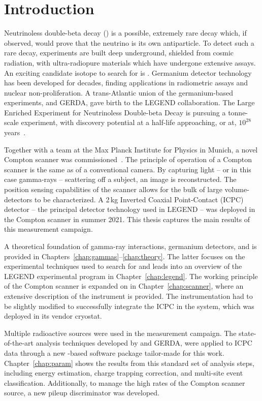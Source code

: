 \chapter{Introduction}

Neutrinoless double-beta decay (\novbb{}) is a possible, extremely rare decay which, if observed, would prove that the neutrino is its own antiparticle. To detect such a rare decay, \novbb{} experiments are built deep underground, shielded from cosmic radiation, with ultra-radiopure materials which have undergone extensive assays. An exciting candidate isotope to search for \novbb{} is \geEn{}. Germanium detector technology has been developed for decades, finding applications in radiometric assays and nuclear non-proliferation.  A trans-Atlantic union of the germanium-based experiments, {\MJDEMit} and GERDA, gave birth to the LEGEND collaboration. The Large Enriched Experiment for Neutrinoless Double-beta Decay is pursuing a tonne-scale \geEn{} experiment, with \novbb{} discovery potential at a half-life approaching, or at, $10^{28}$ years~\cite{LEGEND2021}.

Together with a team at the Max Planck Institute for Physics in Munich, a novel Compton scanner was commissioned~\cite{compton_scanner}. The principle of operation of a Compton scanner is the same as of a conventional camera. By capturing light -- or in this case gamma-rays -- scattering off a subject, an image is reconstructed. The position sensing capabilities of the scanner allows for the bulk of large volume-detectors to be characterized. A 2\,kg Inverted Coaxial Point-Contact (ICPC) detector -- the principal detector technology used in LEGEND -- was deployed in the Compton scanner in summer 2021. This thesis captures the main results of this measurement campaign.

A theoretical foundation of gamma-ray interactions, germanium detectors, and \novbb{} is provided in Chapters~\ref{chap:gammas}--\ref{chap:theory}. The latter focuses on the experimental techniques used to search for \novbb{} and leads into an overview of the LEGEND experimental program in Chapter~\ref{chap:legend}. The working principle of the Compton scanner is expanded on in Chapter~\ref{chap:scanner}, where an extensive description of the instrument is provided. The instrumentation had to be slightly modified to successfully integrate the ICPC in the system, which was deployed in its vendor cryostat. 

Multiple radioactive sources were used in the measurement campaign. The state-of-the-art analysis techniques developed by {\MJMit} and GERDA, were applied to ICPC data through a new \julia{}-based software package tailor-made for this work. Chapter~\ref{chap:param} shows the results from this standard set of analysis steps, including energy estimation, charge trapping correction, and multi-site event classification. Additionally, to manage the high rates of the Compton scanner source, a new pileup discriminator was developed. 

